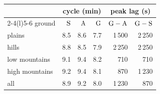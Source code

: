 \begin{tabular}{@{}l r r r r r@{}}
\toprule
 & \multicolumn{3}{c}{cycle (min)} & \multicolumn{2}{c}{peak lag (s)} \\
\cmidrule(lr){2-4}\cmidrule(l){5-6}
ground & $\mathrm{S}$ & $\mathrm{A}$ & $\mathrm{G}$ & $\mathrm{G}-\mathrm{A}$ & $\mathrm{G}-\mathrm{S}$ \\
\midrule
plains & 8.5 & 8.6 & 7.7 & 1\,500 & 2\,250 \\
hills & 8.8 & 8.5 & 7.9 & 2\,250 & 2\,250 \\
low mountains & 9.1 & 9.4 & 8.2 & 710 & 710 \\
high mountains & 9.2 & 9.4 & 8.1 & 870 & 1\,230 \\
all & 8.9 & 9.2 & 8.0 & 1\,230 & 870 \\
\bottomrule
\end{tabular}
